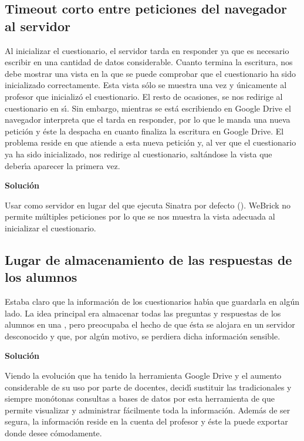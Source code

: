 \subsection{Timeout corto entre peticiones del navegador al servidor}
\label{subsec:4.1.1}
\bigskip

Al inicializar el cuestionario, el servidor tarda en responder ya que es necesario escribir en  una cantidad de datos considerable. Cuanto termina la escritura, 
nos debe mostrar una vista en la que se puede comprobar que el cuestionario ha sido inicializado correctamente. Esta vista s\'olo se muestra una vez y \'unicamente al profesor
que inicializ\'o el cuestionario. El resto de ocasiones, se nos redirige al cuestionario en s\'{\i}. 
Sin embargo, mientras se est\'a escribiendo en Google Drive el navegador interpreta que el  tarda en responder, por lo que le manda una nueva petici\'on  y \'este la 
despacha en cuanto finaliza la escritura en Google Drive. El problema reside en que atiende a esta nueva petici\'on y, al ver que el cuestionario ya ha sido inicializado,
nos redirige al cuestionario, salt\'andose la vista que deber\'{\i}a aparecer la primera vez.
\bigskip

{\normalsize {\bfseries Soluci\'on}}
\bigskip

Usar como servidor \ceis{\ref{apend1:webrick}} en lugar del que ejecuta Sinatra por defecto (\ceis{\ref{apend1:thin}}). WeBrick no permite m\'ultiples peticiones por lo que se nos muestra la 
vista adecuada al inicializar el cuestionario.

\subsection{Lugar de almacenamiento de las respuestas de los alumnos}
\label{subsec:4.1.2}
\bigskip

Estaba claro que la informaci\'on de los cuestionarios hab\'{\i}a que guardarla en alg\'un lado. La idea principal era almacenar todas las preguntas y respuestas de los alumnos
en una , pero preocupaba el hecho de que \'esta se alojara en un servidor desconocido y que, por alg\'un motivo, se perdiera dicha informaci\'on sensible.
\bigskip

{\normalsize {\bfseries Soluci\'on}}
\bigskip

Viendo la evoluci\'on que ha tenido la herramienta Google Drive y el aumento considerable de su uso por parte de docentes, decid\'{\i} sustituir las tradicionales y siempre mon\'otonas 
consultas a bases de datos por esta herramienta de  que permite visualizar y administrar f\'acilmente toda la informaci\'on. Adem\'as de ser segura, la informaci\'on 
reside en la cuenta del profesor y \'este la puede exportar donde desee c\'omodamente.

